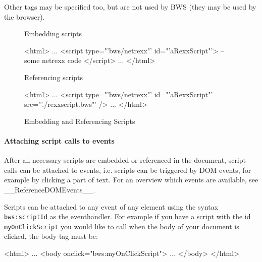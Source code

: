 
Other tags may be specified too, but are not used by BWS (they may be used by the browser).

\begin{figure}[htb]
	\label{fig:EmbeddingAndReferencingScripts}
	Embedding scripts
	\ttfamily 
	\begin{verbatim*}
	<html>
	...
	<script type="'bws/netrexx"' id="'aRexxScript"'>
	-- some netrexx code
	</script>
	...
	</html>
	\end{verbatim*}
	\rmfamily
	
	Referencing scripts
	
	\ttfamily
	\begin{verbatim*}
	<html>
	...
	<script type="'bws/netrexx"' id="'aRexxScript"' src="'./rexxscript.bws"' />
	...
	</html>
	\end{verbatim*}
	
	\rmfamily
	\caption{Embedding and Referencing Scripts}

\end{figure}

\paragraph{Attaching script calls to events}

After all necessary scripts are embedded or referenced in the document, script calls can be attached to events, i.e. scripts can be triggered by DOM events, for example by clicking a part of text. For an overview which events are available, see __ReferenceDOMEvents__.

Scripts can be attached to any event of any element using the syntax \texttt{bws:scriptId} as the eventhandler. For example if you have a script with the id \texttt{myOnClickScript} you would like to call when the body of your document is clicked, the body tag must be:

\ttfamily

\begin{verbatim*}
<html>
...
<body onclick="bws:myOnClickScript">
...
</body>
</html>
\end{verbatim*}

